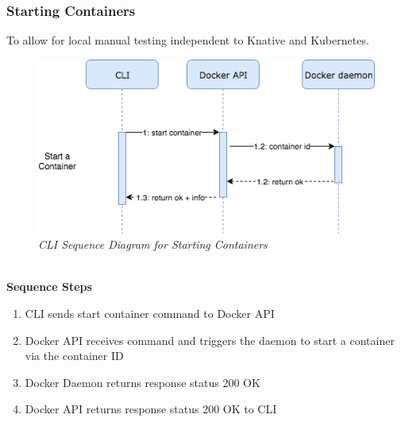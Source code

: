 \subsubsection{Starting Containers}
To allow for local manual testing independent to Knative and Kubernetes.
\begin{figure}[!ht]
\centering
\includegraphics*[width=1\textwidth]{images/sec-start-con.png}
\caption{\em CLI Sequence Diagram for Starting Containers}
\label{img:cli_seq3}
\end{figure}
\\\textbf{Sequence Steps}
\begin{enumerate}
  \item CLI sends start container command to Docker API
  \item Docker API receives command and triggers the daemon to start a container via the container ID
  \item Docker Daemon returns response status 200 OK
  \item Docker API returns response status 200 OK to CLI
\end{enumerate}
\clearpage

